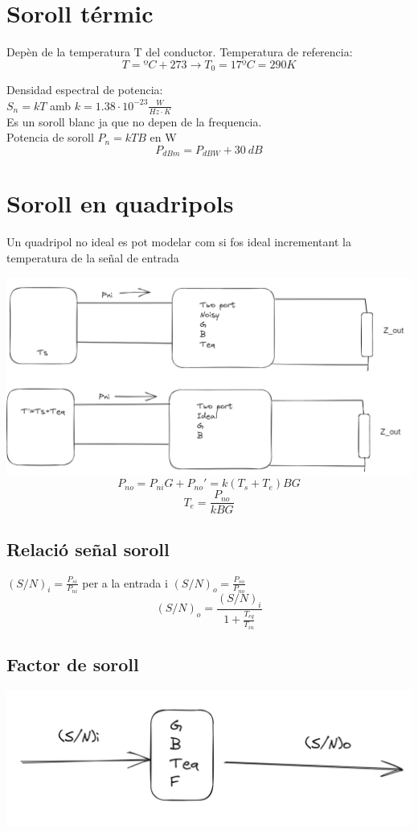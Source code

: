 \documentclass{article}
\begin{document}
\author[1]{Sergio Gómez}
\author[]{Apuntes ER}
\begin{multicols*}{2}
	\section{Soroll térmic}
	Depèn de la temperatura T del conductor.
	Temperatura de referencia:
	$$T=ºC+273\rightarrow T_0=17ºC=290K$$

	Densidad espectral de potencia:\\
	$S_n=kT$ amb $k=1.38\cdot10^{-23}\frac{W}{Hz\cdot K}$\\
	Es un soroll blanc ja que no depen de la frequencia.\\
	Potencia de soroll $P_n=kTB$ en W\\
	$$P_{dBm}=P_{dBW}+30\ dB$$

	\section{Soroll en quadripols}
	Un quadripol no ideal es pot modelar com si fos ideal incrementant la temperatura de la señal de entrada

	\includegraphics[width=1\linewidth]{Screenshot 2023-10-21 123320.png}
	$$P_{no}=P_{ni}G+P_{no}'=k(T_s+T_e)BG$$
	$$T_e=\frac{P_{no}}{kBG}$$
	\subsection{Relació señal soroll}
	$(S/N)_i=\frac{P_{si}}{P_{ni}}$ per a la entrada i $(S/N)_o=\frac{P_{so}}{P_{no}}$
	$$(S/N)_o=\frac{(S/N)_i}{1+\frac{T_{eq}}{T_{in}}}$$
	\subsection{Factor de soroll}
	\includegraphics[width=1\linewidth]{quaddiagram.png}


\end{multicols*}
\end{document}

